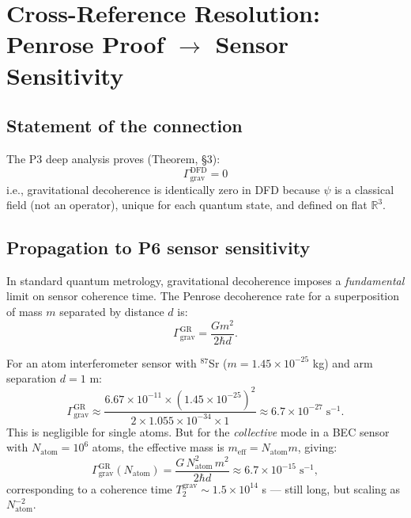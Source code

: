 \documentclass[11pt]{article}
\theoremstyle{definition}
\theoremstyle{remark}
\begin{document}
\section{Cross-Reference Resolution: Penrose Proof $\to$ Sensor
Sensitivity}\label{sec:penrose-sensor}

\subsection{Statement of the connection}

The P3 deep analysis proves (Theorem, \S3):
\begin{equation}
\boxed{\Gamma_{\mathrm{grav}}^{\mathrm{DFD}} = 0}
\label{eq:zero-decoherence}
\end{equation}
i.e., gravitational decoherence is identically zero in DFD because
$\psi$ is a classical field (not an operator), unique for each quantum
state, and defined on flat $\mathbb{R}^3$.

\subsection{Propagation to P6 sensor sensitivity}

In standard quantum metrology, gravitational decoherence imposes a
\emph{fundamental} limit on sensor coherence time. The Penrose
decoherence rate for a superposition of mass $m$ separated by
distance $d$ is:
\begin{equation}
\Gamma_{\mathrm{grav}}^{\mathrm{GR}} = \frac{Gm^2}{2\hbar d}.
\label{eq:penrose-rate}
\end{equation}

For an atom interferometer sensor with $^{87}$Sr ($m = 1.45 \times
10^{-25}$ kg) and arm separation $d = 1$ m:
\begin{equation}
\Gamma_{\mathrm{grav}}^{\mathrm{GR}} \approx \frac{6.67\times 10^{-11}
\times (1.45\times 10^{-25})^2}{2 \times 1.055\times 10^{-34} \times 1}
\approx 6.7 \times 10^{-27}\;\mathrm{s}^{-1}.
\end{equation}
This is negligible for single atoms. But for the \emph{collective}
mode in a BEC sensor with $N_{\mathrm{atom}} = 10^6$ atoms, the
effective mass is $m_{\mathrm{eff}} = N_{\mathrm{atom}} m$, giving:
\begin{equation}
\Gamma_{\mathrm{grav}}^{\mathrm{GR}}(N_{\mathrm{atom}}) =
\frac{G\,N_{\mathrm{atom}}^2\,m^2}{2\hbar d}
\approx 6.7\times 10^{-15}\;\mathrm{s}^{-1},
\end{equation}
corresponding to a coherence time $T_2^{\mathrm{grav}} \sim 1.5 \times
10^{14}$ s --- still long, but scaling as $N_{\mathrm{atom}}^{-2}$.
\end{document}
